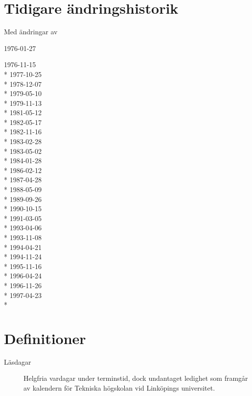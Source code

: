 \documentclass{datateknologsektionen-document}
\begin{document}
  \pagebreak
  \section*{Tidigare ändringshistorik}
  \begin{labeling}{Med ändringar av}
    \item [Antagna] 1976-01-27
    \item [Med ändringar av]
      1976-11-15 \\*
      1977-10-25 \\*
      1978-12-07 \\*
      1979-05-10 \\*
      1979-11-13 \\*
      1981-05-12 \\*
      1982-05-17 \\*
      1982-11-16 \\*
      1983-02-28 \\*
      1983-05-02 \\*
      1984-01-28 \\*
      1986-02-12 \\*
      1987-04-28 \\*
      1988-05-09 \\*
      1989-09-26 \\*
      1990-10-15 \\*
      1991-03-05 \\*
      1993-04-06 \\*
      1993-11-08 \\*
      1994-04-21 \\*
      1994-11-24 \\*
      1995-11-16 \\*
      1996-04-24 \\*
      1996-11-26 \\*
      1997-04-23 \\*
  \end{labeling}
  \pagebreak

  \tableofcontents

  \pagebreak

  \section*{Definitioner}
  \begin{description}  
    \item [Läsdagar]
    Helgfria vardagar under terminstid, dock undantaget ledighet som
    framgår av kalendern för Tekniska högskolan vid Linköpings universitet. 
  \end{description}
\end{document}
